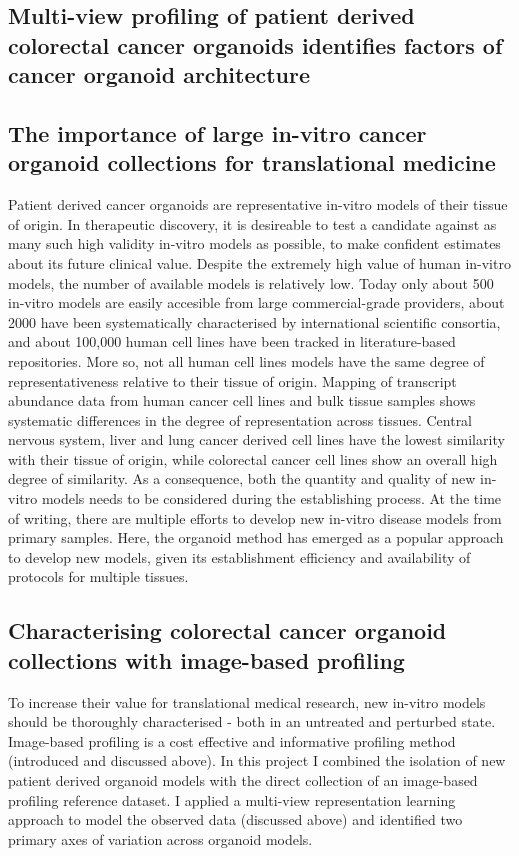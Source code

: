 \begin{flushleft}
\section{Multi-view profiling of patient derived colorectal cancer organoids identifies factors of cancer organoid architecture}

\subsection{The importance of large in-vitro cancer organoid collections for translational medicine}

Patient derived cancer organoids are representative in-vitro models of their tissue of origin. In therapeutic discovery, it is desireable to test a candidate against as many such high validity in-vitro models as possible, to make confident estimates about its future clinical value. Despite the extremely high value of human in-vitro models, the number of available models is relatively low. Today only about 500 in-vitro models are easily accesible from large commercial-grade providers, about 2000 have been systematically characterised by international scientific consortia, and about 100,000 human cell lines have been tracked in literature-based repositories. More so, not all human cell lines models have the same degree of representativeness relative to their tissue of origin. Mapping of transcript abundance data from human cancer cell lines and bulk tissue samples shows systematic differences in the degree of representation across tissues. Central nervous system, liver and lung cancer derived cell lines have the lowest similarity with their tissue of origin, while colorectal cancer cell lines show an overall high degree of similarity. As a consequence, both the quantity and quality of new in-vitro models needs to be considered during the establishing process. At the time of writing, there are multiple efforts to develop new in-vitro disease models from primary samples. Here, the organoid method has emerged as a popular approach to develop new models, given its establishment efficiency and availability of protocols for multiple tissues. 
\bigbreak

\subsection{Characterising colorectal cancer organoid collections with image-based profiling}

To increase their value for translational medical research, new in-vitro models should be thoroughly characterised - both in an untreated and perturbed state. Image-based profiling is a cost effective and informative profiling method (introduced and discussed above). In this project I combined the isolation of new patient derived organoid models with the direct collection of an image-based profiling reference dataset. I applied a multi-view representation learning approach to model the observed data (discussed above) and identified two primary axes of variation across organoid models. 
\bigbreak


\end{flushleft}

